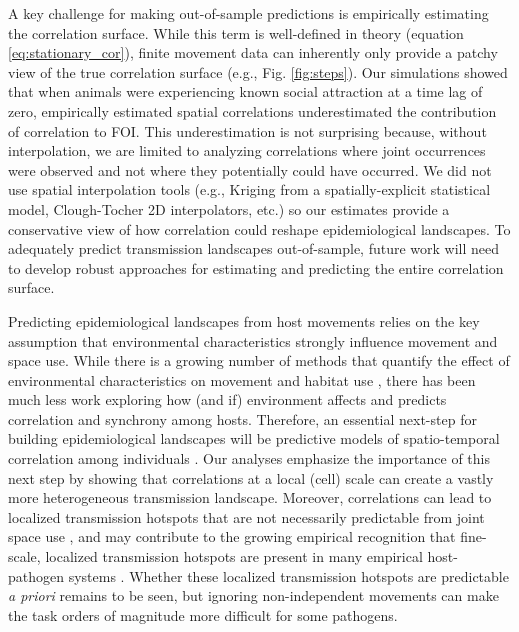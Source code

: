\documentclass[letterpaper]{article}
\begin{document}
A key challenge for making out-of-sample predictions is empirically estimating the correlation surface.  While this term is well-defined in theory (equation \ref{eq:stationary_cor}), finite movement data can inherently only provide a patchy view of the true correlation surface (e.g., Fig. \ref{fig:steps}).  Our simulations showed that when animals were experiencing known social attraction at a time lag of zero, empirically estimated spatial correlations underestimated the contribution of correlation to FOI. This underestimation is not surprising because, without interpolation, we are limited to analyzing correlations where joint occurrences were observed and not where they potentially could have occurred. We did not use spatial interpolation tools (e.g., Kriging from a spatially-explicit statistical model, Clough-Tocher 2D interpolators, etc.) so our estimates provide a conservative view of how correlation could reshape epidemiological landscapes.  To adequately predict transmission landscapes out-of-sample, future work will need to develop robust approaches for estimating and predicting the entire correlation surface. 

Predicting epidemiological landscapes from host movements relies on the key assumption that environmental characteristics strongly influence movement and space use. While there is a growing number of methods that quantify the effect of environmental characteristics on movement and habitat use \citep[reviewed in][]{Hooten2017a}, there has been much less work exploring how (and if) environment affects and predicts correlation and synchrony among hosts.  Therefore, an essential next-step for building epidemiological landscapes will be predictive models of spatio-temporal correlation among individuals \citep[e.g.][]{Brandell2021}.
Our analyses emphasize the importance of this next step by showing that correlations at a local (cell) scale can create a vastly more heterogeneous transmission landscape. Moreover, correlations can lead to localized transmission hotspots that are not necessarily predictable from joint space use \citep{Yang2023a}, and may contribute to the growing empirical recognition that fine-scale, localized transmission hotspots are present in many empirical host-pathogen systems \citep{Albery2021}.  Whether these localized transmission hotspots are predictable \emph{a priori} remains to be seen, but ignoring non-independent movements can make the task orders of magnitude more difficult for some pathogens.

%

\end{document}
